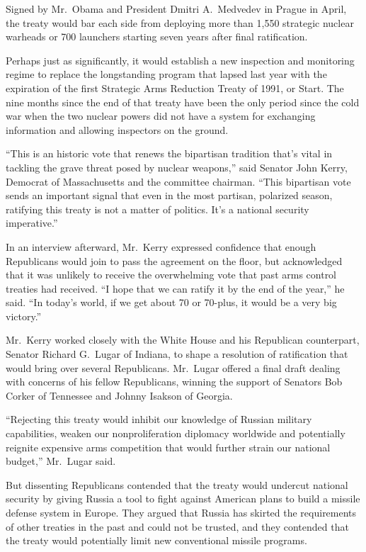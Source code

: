 ﻿\documentclass[12pt]{article}
\begin{document}
Signed by Mr.~Obama and President Dmitri A.~Medvedev in Prague in April, the treaty would bar each
side from deploying more than 1,550 strategic nuclear warheads or 700 launchers starting seven years
after final ratification.

Perhaps just as significantly, it would establish a new inspection and monitoring regime to replace
the longstanding program that lapsed last year with the expiration of the first Strategic Arms
Reduction Treaty of 1991, or Start. The nine months since the end of that treaty have been the only
period since the cold war when the two nuclear powers did not have a system for exchanging
information and allowing inspectors on the ground.

``This is an historic vote that renews the bipartisan tradition that's vital in tackling the grave
threat posed by nuclear weapons,'' said Senator John Kerry, Democrat of Massachusetts and the
committee chairman. ``This bipartisan vote sends an important signal that even in the most partisan,
polarized season, ratifying this treaty is not a matter of politics. It's a national security
imperative.''

In an interview afterward, Mr.~Kerry expressed confidence that enough Republicans would join to pass
the agreement on the floor, but acknowledged that it was unlikely to receive the overwhelming vote
that past arms control treaties had received. ``I hope that we can ratify it by the end of the
year,'' he said. ``In today's world, if we get about 70 or 70-plus, it would be a very big
victory.''

Mr.~Kerry worked closely with the White House and his Republican counterpart, Senator Richard
G.~Lugar of Indiana, to shape a resolution of ratification that would bring over several
Republicans. Mr.~Lugar offered a final draft dealing with concerns of his fellow Republicans,
winning the support of Senators Bob Corker of Tennessee and Johnny Isakson of Georgia.

``Rejecting this treaty would inhibit our knowledge of Russian military capabilities, weaken our
nonproliferation diplomacy worldwide and potentially reignite expensive arms competition that would
further strain our national budget,'' Mr.~Lugar said.

But dissenting Republicans contended that the treaty would undercut national security by giving
Russia a tool to fight against American plans to build a missile defense system in Europe. They
argued that Russia has skirted the requirements of other treaties in the past and could not be
trusted, and they contended that the treaty would potentially limit new conventional missile
programs.
\end{document}
